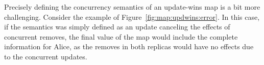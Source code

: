 \documentclass[11pt,a4paper]{article}
\begin{document}
Precisely defining the concurrency semantics of an update-wins map is a bit more challenging.
Consider the example of Figure~\ref{fig:map:updwins:error}.
In this case, if the semantics was simply defined as an update canceling the effects of concurrent 
removes, the final value of the map would include the complete information for Alice, as the 
removes in both replicas would have no effects due to the concurrent updates.
 
\end{document}
